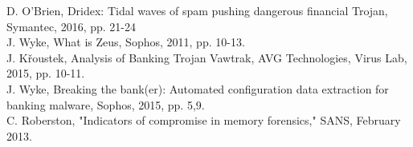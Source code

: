 \documentclass[conference]{IEEEtran}
\begin{document}

%
%
%
\begin{thebibliography}{}
 
D. O'Brien, Dridex: Tidal waves of spam pushing dangerous financial Trojan, 		Symantec, 2016, pp. 21-24\\
J. Wyke, What is Zeus, Sophos, 2011, pp. 10-13.\\
J. Křoustek, Analysis of Banking Trojan Vawtrak, AVG Technologies, Virus Lab, 2015, pp. 10-11.\\
J. Wyke, Breaking the bank(er): Automated configuration data extraction for banking malware, Sophos, 2015, pp. 5,9.\\
C. Roberston, "Indicators of compromise in memory forensics," SANS, February 2013.\\
 

\end{thebibliography}




\end{document}
